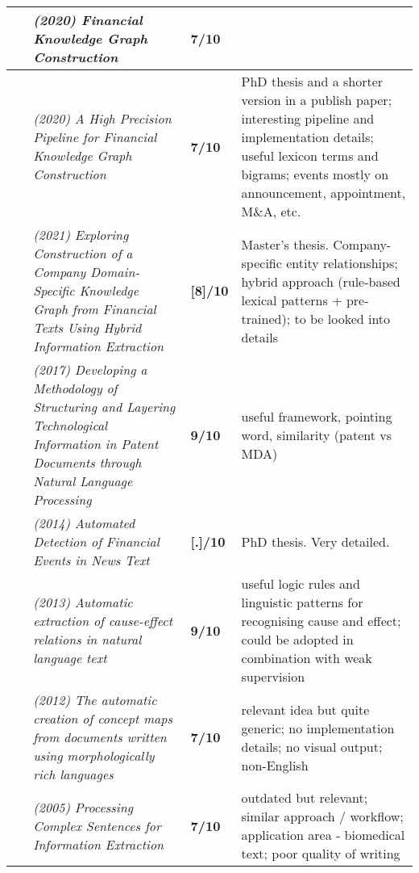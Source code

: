 \documentclass[10pt]{article}
\begin{document}
\begin{landscape}
\begin{longtable}{ |m{2em}|m{28em}|m{3em}|m{24em}| }
~\cite{2020_finKG_thesis} & \emph{(2020) Financial Knowledge Graph Construction} 
& \textbf{7/10} &  \\
\hline

~\cite{2020_finKG_short} & \emph{(2020) A High Precision Pipeline for Financial Knowledge Graph Construction}
& \textbf{7/10} & PhD thesis and a shorter version in a publish paper; interesting pipeline and implementation details; useful lexicon terms and bigrams; events mostly on announcement, appointment, M\&A, etc. \\
 \hline

~\cite{2021_finKGhybrid}  &\emph{(2021) Exploring Construction of a Company Domain-Specific Knowledge Graph from Financial Texts Using Hybrid Information Extraction}
& \textbf{[8]/10} & Master's thesis. Company-specific entity relationships; hybrid approach (rule-based lexical patterns + pre-trained); to be looked into details\\
 \hline

~\cite{2017_patent} & \emph{(2017) Developing a Methodology of Structuring and Layering Technological Information in Patent Documents through Natural Language Processing}
& \textbf{9/10} & useful framework, pointing word, similarity (patent vs MDA)\\
 \hline

~\cite{2014_finNewsEvents} & \emph{(2014) Automated Detection of Financial Events in News Text}
& \textbf{[.]/10} & PhD thesis. Very detailed. \\
 \hline

~\cite{2013_extraction_causeEffect} & \emph{(2013) Automatic extraction of cause-effect relations in natural language text}
& \textbf{9/10} & useful logic rules and linguistic patterns for recognising cause and effect; could be adopted in combination with weak supervision \\
 \hline

~\cite{2012_extraction_conceptmap} & \emph{(2012) The automatic creation of concept maps from documents written using morphologically rich languages}
& \textbf{7/10} & relevant idea but quite generic; no implementation details; no visual output; non-English\\
 \hline

~\cite{2005_extraction_complexSentences} & \emph{(2005) Processing Complex Sentences for Information Extraction}
& \textbf{7/10} & outdated but relevant; similar approach / workflow; application area - biomedical text; poor quality of writing \\
 \hline


\end{longtable}
\end{landscape}
\end{document}
